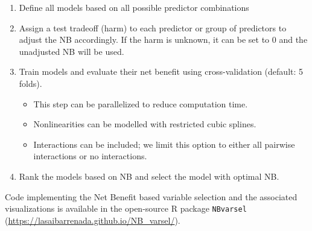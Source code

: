 \begin{enumerate}
\item Define all models based on all possible predictor combinations
\item Assign a test tradeoff (harm) to each predictor or group of predictors to adjust the \gls{NB} accordingly. If the harm is unknown, it can be set to 0 and the unadjusted \gls{NB} will be used.
\item Train models and evaluate their net benefit using cross-validation (default: 5 folds).
\begin{itemize}
\item This step can be parallelized to reduce computation time.
\item Nonlinearities can be modelled with restricted cubic splines.
\item Interactions can be included; we limit this option to either all pairwise interactions or no interactions.
\end{itemize}
\item Rank the models based on \gls{NB} and select the model with optimal \gls{NB}.
\end{enumerate}

Code implementing the Net Benefit based variable selection and the associated visualizations is available in the open-source R package \texttt{NBvarsel} (\url{https://lasaibarrenada.github.io/NB_varsel/}).






